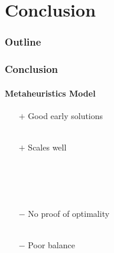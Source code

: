 \documentclass{beamer}
\newcommand{\AutoSectionTitle}{}
\begin{document}


\renewcommand{\AutoSectionTitle}{Conclusion}

\section{\AutoSectionTitle}

\begin{frame}
  \frametitle{Outline}
  \tableofcontents[currentsection]
\end{frame}




\begin{frame}
  \frametitle{\AutoSectionTitle}
  \framesubtitle{Metaheuristics Model}

  \begin{itemize}
  \item[$+$] Good early solutions \\~\\
  \item[$+$] Scales well \\~\\~\\~\\~\\

    \pause
    
  \item[$-$] No proof of optimality \\~\\    
  \item[$-$] Poor balance
  \end{itemize}

\end{frame}


\end{document}
